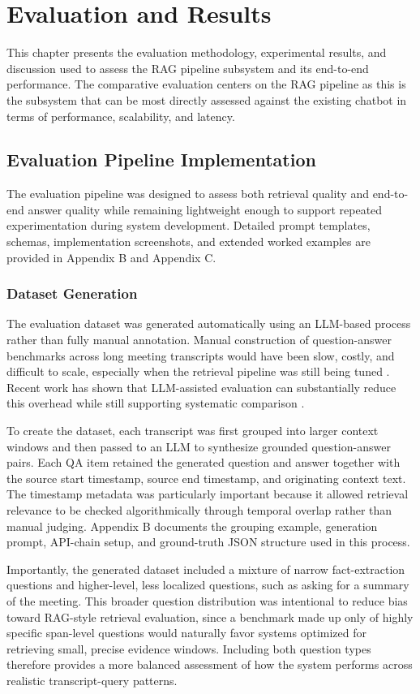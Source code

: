\chapter{Evaluation and Results}
This chapter presents the evaluation methodology, experimental results, and discussion used to assess the RAG pipeline subsystem and its end-to-end performance. The comparative evaluation centers on the RAG pipeline as this is the subsystem that can be most directly assessed against the existing chatbot in terms of performance, scalability, and latency.

\section{Evaluation Pipeline Implementation}
The evaluation pipeline was designed to assess both retrieval quality and end-to-end answer quality while remaining lightweight enough to support repeated experimentation during system development. Detailed prompt templates, schemas, implementation screenshots, and extended worked examples are provided in Appendix B and Appendix C.

\subsection{Dataset Generation}
The evaluation dataset was generated automatically using an LLM-based process rather than fully manual annotation. Manual construction of question-answer benchmarks across long meeting transcripts would have been slow, costly, and difficult to scale, especially when the retrieval pipeline was still being tuned \cite{ares2023}. Recent work has shown that LLM-assisted evaluation can substantially reduce this overhead while still supporting systematic comparison \cite{ragas2023}.

To create the dataset, each transcript was first grouped into larger context windows and then passed to an LLM to synthesize grounded question-answer pairs. Each QA item retained the generated question and answer together with the source start timestamp, source end timestamp, and originating context text. The timestamp metadata was particularly important because it allowed retrieval relevance to be checked algorithmically through temporal overlap rather than manual judging. Appendix B documents the grouping example, generation prompt, API-chain setup, and ground-truth JSON structure used in this process.

Importantly, the generated dataset included a mixture of narrow fact-extraction questions and higher-level, less localized questions, such as asking for a summary of the meeting. This broader question distribution was intentional to reduce bias toward RAG-style retrieval evaluation, since a benchmark made up only of highly specific span-level questions would naturally favor systems optimized for retrieving small, precise evidence windows. Including both question types therefore provides a more balanced assessment of how the system performs across realistic transcript-query patterns.

